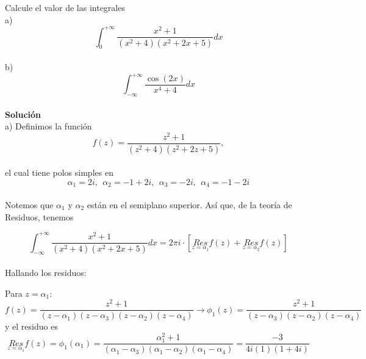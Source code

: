 \documentclass[a4paper,12pt]{article}
\begin{document}
Calcule el valor de las integrales \\

a)\[\int_{0}^{+ \infty}\frac{x^{2} + 1}{\left( x^{2} + 4 \right)\left( x^{2} + 2x + 5 \right)}dx
\] \\

b)\[\int_{- \infty}^{+ \infty}\frac{\cos(2x)}{x^{4} + 4}dx
\]\\
\textbf{Solución}\\
a) Definimos la función \[f(z) = \frac{z^{2} + 1}{\left( z^{2} + 4 \right)\left( z^{2} + 2z + 5 \right)},\]
\\
el cual tiene polos simples en
\[
\alpha_{1} = 2i,\ \ \alpha_{2} = - 1 + 2i,\ \ \alpha_{3} = - 2i,\ \ \alpha_{4} = - 1 - 2i
\]\\
Notemos que $\alpha_{1}$ y $\alpha_{2}$ están en el semiplano superior.
Así que, de la teoría de Residuos, tenemos

\[
\int_{- \infty}^{+ \infty}\frac{x^{2} + 1}{\left( x^{2} + 4 \right)\left( x^{2} + 2x + 5 \right)}dx = 2\pi i \cdot \left\lbrack \underset{z = \alpha_{1}}{Res}{f(z)} + \underset{z = \alpha_{2}}{Res}{f(z)} \right\rbrack
\]\\
Hallando los residuos:

Para $z = \alpha_{1}$:
\[
f(z) = \frac{z^{2} + 1}{\left( z - \alpha_{1} \right)\left( z - \alpha_{3} \right)\left( z - \alpha_{2} \right)\left( z - \alpha_{4} \right)} \rightarrow \phi_{1}(z) = \frac{z^{2} + 1}{\left( z - \alpha_{3} \right)\left( z - \alpha_{2} \right)\left( z - \alpha_{4} \right)}
\]
y el residuo es
\[
\underset{z = \alpha_{1}}{Res}{f(z)} = \phi_{1}\left( \alpha_{1} \right) = \frac{\alpha_{1}^{2} + 1}{\left( \alpha_{1} - \alpha_{3} \right)\left( \alpha_{1} - \alpha_{2} \right)\left( \alpha_{1} - \alpha_{4} \right)} = \frac{- 3}{4i(1)(1 + 4i)}
\]
\end{document}
